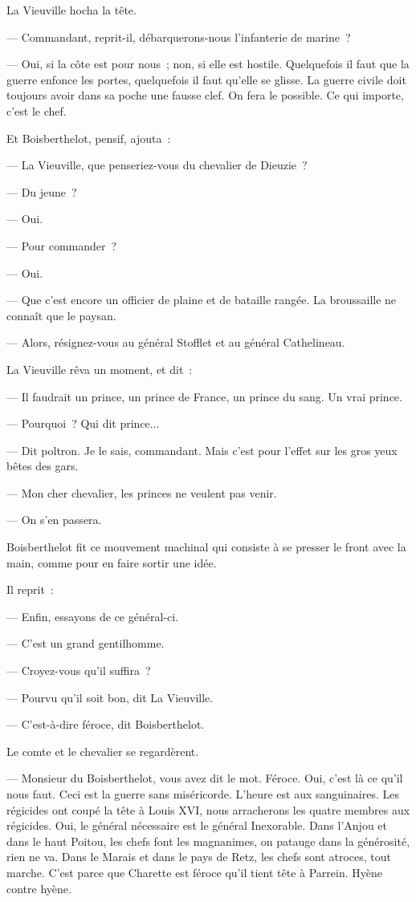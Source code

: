 \documentclass[french,twoside]{book} %
\begin{document}
La Vieuville hocha la tête.\par
— Commandant, reprit-il, débarquerons-nous l’infanterie de marine ?\par
— Oui, si la côte est pour nous ; non, si elle est hostile. Quelquefois il faut que la guerre enfonce les portes, quelquefois il faut qu’elle se glisse. La guerre civile doit toujours avoir dans sa poche une fausse clef. On fera le possible. Ce qui importe, c’est le chef.\par
Et Boisberthelot, pensif, ajouta :\par
— La Vieuville, que penseriez-vous du chevalier de Dieuzie ?\par
— Du jeune ?\par
— Oui.\par
— Pour commander ?\par
— Oui.\par
— Que c’est encore un officier de plaine et de bataille rangée. La broussaille ne connaît que le paysan.\par
— Alors, résignez-vous au général Stofflet et au général Cathelineau.\par
La Vieuville rêva un moment, et dit :\par
— Il faudrait un prince, un prince de France, un prince du sang. Un vrai prince.\par
— Pourquoi ? Qui dit prince...\par
 — Dit poltron. Je le sais, commandant. Mais c’est pour l’effet sur les gros yeux bêtes des gars.\par
— Mon cher chevalier, les princes ne veulent pas venir.\par
— On s’en passera.\par
Boisberthelot fit ce mouvement machinal qui consiste à se presser le front avec la main, comme pour en faire sortir une idée.\par
Il reprit :\par
— Enfin, essayons de ce général-ci.\par
— C’est un grand gentilhomme.\par
— Croyez-vous qu’il suffira ?\par
— Pourvu qu’il soit bon, dit La Vieuville.\par
— C’est-à-dire féroce, dit Boisberthelot.\par
Le comte et le chevalier se regardèrent.\par
— Monsieur du Boisberthelot, vous avez dit le mot. Féroce. Oui, c’est là ce qu’il nous faut. Ceci est la guerre sans miséricorde. L’heure est aux sanguinaires. Les régicides ont coupé la tête à Louis XVI, nous arracherons les quatre membres aux régicides. Oui, le général nécessaire est le général Inexorable. Dans l’Anjou et dans le haut Poitou, les chefs font les magnanimes, on patauge dans la générosité, rien ne va. Dans le Marais et dans le pays de Retz, les chefs sont atroces, tout marche. C’est parce que Charette est féroce qu’il tient tête à Parrein. Hyène contre hyène.\par
\end{document}
